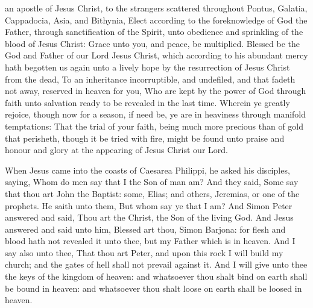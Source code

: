  an apostle of Jesus Christ, to the strangers scattered throughout Pontus, Galatia, Cappadocia, Asia, and Bithynia, Elect according to the foreknowledge of God the Father, through sanctification of the Spirit, unto obedience and sprinkling of the blood of Jesus Christ: Grace unto you, and peace, be multiplied. Blessed be the God and Father of our Lord Jesus Christ, which according to his abundant mercy hath begotten us again unto a lively hope by the resurrection of Jesus Christ from the dead, To an inheritance incorruptible, and undefiled, and that fadeth not away, reserved in heaven for you, Who are kept by the power of God through faith unto salvation ready to be revealed in the last time. Wherein ye greatly rejoice, though now for a season, if need be, ye are in heaviness through manifold temptations: That the trial of your faith, being much more precious than of gold that perisheth, though it be tried with fire, might be found unto praise and honour and glory at the appearing of Jesus Christ our Lord.


\tractnotice


 When Jesus came into the coasts of Caesarea Philippi, he asked his disciples, saying, Whom do men say that I the Son of man am? And they said, Some say that thou art John the Baptist: some, Elias; and others, Jeremias, or one of the prophets. He saith unto them, But whom say ye that I am? And Simon Peter answered and said, Thou art the Christ, the Son of the living God. And Jesus answered and said unto him, Blessed art thou, Simon Barjona: for flesh and blood hath not revealed it unto thee, but my Father which is in heaven. And I say also unto thee, That thou art Peter, and upon this rock I will build my church; and the gates of hell shall not prevail against it. And I will give unto thee the keys of the kingdom of heaven: and whatsoever thou shalt bind on earth shall be bound in heaven: and whatsoever thou shalt loose on earth shall be loosed in heaven.

